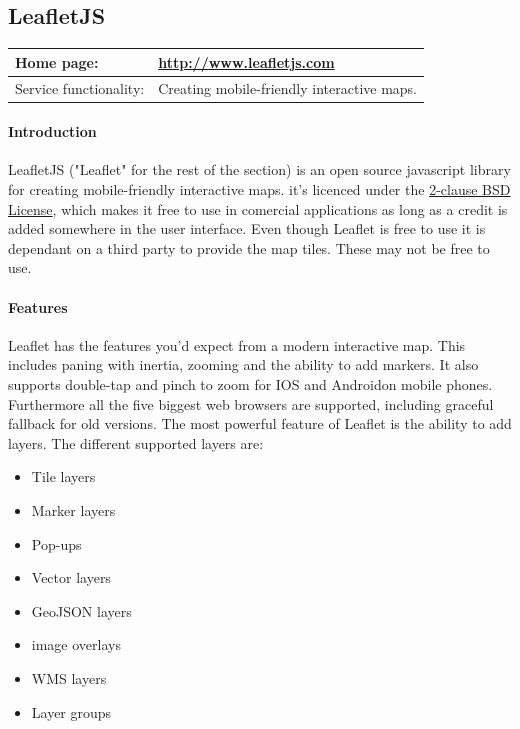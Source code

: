 \documentclass[11pt,a4paper,titlepage,oneside]{report}
\begin{document}
    \subsection{LeafletJS}
    \begin{tabular}{|p{4cm}|p{8cm}|}
      \hline
      Home page: & \url{http://www.leafletjs.com} \\
      \hline
      Service functionality: & Creating mobile-friendly interactive maps. \\
      \hline
    \end{tabular}
    
    \paragraph{Introduction} \indent
    LeafletJS ("Leaflet" for the rest of the section) is an open source javascript library for creating mobile-friendly interactive maps. it's licenced under the \href{'https://github.com/Leaflet/Leaflet/blob/master/LICENSE'}{2-clause BSD License}, which makes it free to use in comercial applications as long as a credit is added somewhere in the user interface.
    Even though Leaflet is free to use it is dependant on a third party to provide the map tiles. These may not be free to use.

    \paragraph{Features}
    Leaflet has the features you'd expect from a modern interactive map. This includes paning with inertia, zooming and the ability to add markers. It also supports double-tap and pinch to zoom for IOS and Androidon mobile phones. Furthermore all the five biggest web browsers are supported, including graceful fallback for old versions.
    The most powerful feature of Leaflet is the ability to add layers. 
    \newline The different supported layers are:

    \begin{itemize}
      \item Tile layers
      \item Marker layers
      \item Pop-ups
      \item Vector layers
      \item GeoJSON layers
      \item image overlays
      \item WMS layers
      \item Layer groups
    \end{itemize}
\end{document}
